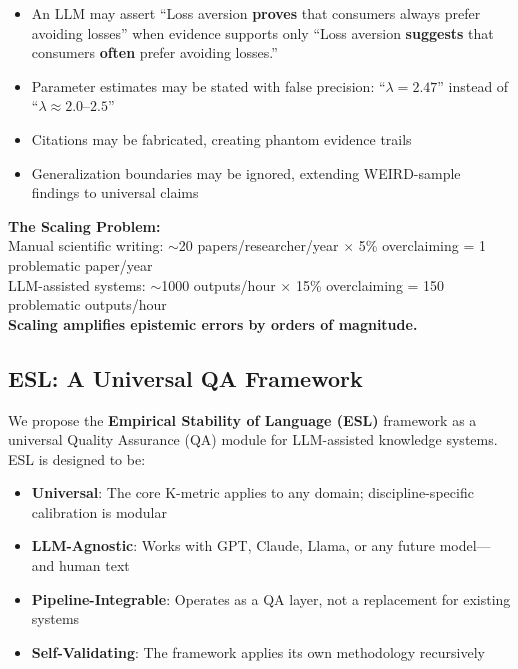 \documentclass[11pt,a4paper]{article}
\begin{document}
\begin{itemize}
    \item An LLM may assert ``Loss aversion \textbf{proves} that consumers always prefer avoiding losses'' when evidence supports only ``Loss aversion \textbf{suggests} that consumers \textbf{often} prefer avoiding losses.''
    \item Parameter estimates may be stated with false precision: ``$\lambda = 2.47$'' instead of ``$\lambda \approx 2.0$--$2.5$''
    \item Citations may be fabricated, creating phantom evidence trails
    \item Generalization boundaries may be ignored, extending WEIRD-sample findings to universal claims
\end{itemize}

\begin{warningbox}
\textbf{The Scaling Problem:} \\
Manual scientific writing: $\sim$20 papers/researcher/year $\times$ 5\% overclaiming = 1 problematic paper/year \\
LLM-assisted systems: $\sim$1000 outputs/hour $\times$ 15\% overclaiming = 150 problematic outputs/hour \\[0.5em]
\textbf{Scaling amplifies epistemic errors by orders of magnitude.}
\end{warningbox}

\subsection{ESL: A Universal QA Framework}

We propose the \textbf{Empirical Stability of Language (ESL)} framework as a universal Quality Assurance (QA) module for LLM-assisted knowledge systems. ESL is designed to be:

\begin{itemize}
    \item \textbf{Universal}: The core K-metric applies to any domain; discipline-specific calibration is modular
    \item \textbf{LLM-Agnostic}: Works with GPT, Claude, Llama, or any future model---and human text
    \item \textbf{Pipeline-Integrable}: Operates as a QA layer, not a replacement for existing systems
    \item \textbf{Self-Validating}: The framework applies its own methodology recursively
\end{itemize}
\end{document}
